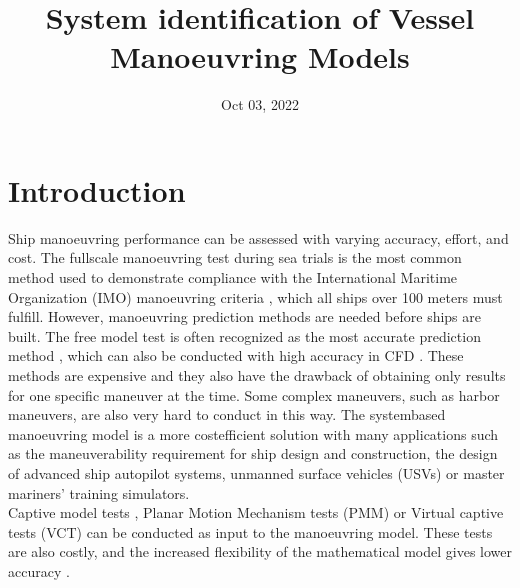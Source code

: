 \documentclass[review]{elsarticle}
\title{System identification of Vessel Manoeuvring Models}
\date{Oct 03, 2022}
\begin{document}



\pagestyle{empty}

\pagestyle{plain}

\pagestyle{normal}
\label{\detokenize{index::doc}}



\section{Introduction}
\label{\detokenize{00.02_introduction:introduction}}\label{\detokenize{00.02_introduction::doc}}
\sphinxAtStartPar
Ship manoeuvring performance can be assessed with varying accuracy, effort, and cost. The full\sphinxhyphen{}scale manoeuvring test during sea trials is the most common method used to demonstrate compliance with the International Maritime Organization (IMO) manoeuvring criteria \cite{imo_standards_2002}, which all ships over 100 meters must fulfill.
However, manoeuvring prediction methods are needed before ships are built. The free model test \cite{ittc_ittc_2008} is often recognized as the most accurate prediction method \cite{ittc_maneuvering_2008}, which can also be conducted with high accuracy in CFD \cite{araki_estimating_2012}. These methods are expensive and they also have the drawback of obtaining only results for one specific maneuver at the time. Some complex maneuvers, such as harbor maneuvers, are also very hard to conduct in this way.
The system\sphinxhyphen{}based manoeuvring model is a more cost\sphinxhyphen{}efficient solution with many applications such as the maneuverability requirement for ship design and construction, the design of advanced ship autopilot systems, unmanned surface vehicles (USVs) \cite{bai_review_2022} or master mariners’ training simulators.\\
Captive model tests \cite{ittc_ittc_2008-1}, Planar Motion Mechanism tests (PMM) \cite{ittc_ittc_2008-1} or Virtual captive tests (VCT) \cite{liu_predictions_2018} can be conducted as input to the manoeuvring model. These tests are also costly, and the increased flexibility of the mathematical model gives lower accuracy \cite{ittc_maneuvering_2008}.
\end{document}

